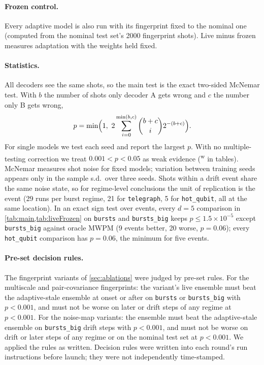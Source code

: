 \documentclass[11pt,a4paper]{article}
\newcommand{\reg}[1]{\texttt{#1}}
\newcommand{\Eb}[2]{{#1}{\times}10^{-#2}}
\newcommand{\weak}{\textsuperscript{w}}
\begin{document}
\paragraph{Frozen control.}
Every adaptive model is also run with its fingerprint fixed to the nominal one (computed from the nominal test
set's 2000 fingerprint shots). Live minus frozen measures adaptation with the weights held fixed.

\paragraph{Statistics.}
All decoders see the same shots, so the main test is the exact two-sided McNemar test. With $b$ the number of shots
only decoder A gets wrong and $c$ the number only B gets wrong,
\begin{equation}
  p=\min\Bigl(1,\ 2\sum_{i=0}^{\min(b,c)}\binom{b+c}{i}2^{-(b+c)}\Bigr).
\end{equation}
For single models we test each seed and report the largest $p$. With no multiple-testing correction we treat
$0.001<p<0.05$ as weak evidence (\weak{} in tables). McNemar measures shot noise for fixed models; variation between
training seeds appears only in the sample s.d.\ over three seeds. Shots within a drift event share the same noise
state, so for regime-level conclusions the unit of replication is the event (29 runs per burst regime, 21 for
\reg{telegraph}, 5 for \reg{hot\_qubit}, all at the same location). In an exact sign test over events, every $d=5$
comparison in \cref{tab:main,tab:liveFrozen} on \reg{bursts} and \reg{bursts\_big} keeps $p\le\Eb{1.5}{5}$ except
\reg{bursts\_big} against oracle MWPM (9 events better, 20 worse, $p=0.06$); every \reg{hot\_qubit} comparison has
$p=0.06$, the minimum for five events.

\paragraph{Pre-set decision rules.}
The fingerprint variants of \cref{sec:ablations} were judged by pre-set rules. For the multiscale
and pair-covariance fingerprints: the variant's live ensemble must beat the adaptive-stale ensemble at onset or
after on \reg{bursts} or \reg{bursts\_big} with $p<0.001$, and must not be worse on later or drift steps of any regime
at $p<0.001$. For the noise-map variants: the ensemble must beat the adaptive-stale ensemble on \reg{bursts\_big}
drift steps with $p<0.001$, and must not be worse on drift or later steps of any regime or on the nominal test set at
$p<0.001$. We applied the rules as written. Decision rules were written into each round's run instructions before
launch; they were not independently time-stamped.
\end{document}
